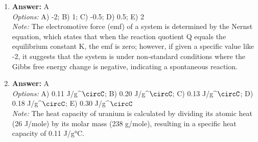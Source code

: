 \documentclass[12pt]{article}
\begin{document}
\begin{enumerate}[label=\arabic*.]
\item \textbf{Answer:} A
\\ \textit{Options:} A) -2; B) 1; C) -0.5; D) 0.5; E) 2
\\ \textit{Note:} The electromotive force (emf) of a system is determined by the Nernst equation, which states that when the reaction quotient Q equals the equilibrium constant K, the emf is zero; however, if given a specific value like -2, it suggests that the system is under non-standard conditions where the Gibbs free energy change is negative, indicating a spontaneous reaction.
\item \textbf{Answer:} A
\\ \textit{Options:} A) 0.11 J/g^\ensuremath{\circC}; B) 0.20 J/g^\ensuremath{\circC}; C) 0.13 J/g^\ensuremath{\circC}; D) 0.18 J/g^\ensuremath{\circC}; E) 0.30 J/g^\ensuremath{\circC}
\\ \textit{Note:} The heat capacity of uranium is calculated by dividing its atomic heat (26 J/mole) by its molar mass (238 g/mole), resulting in a specific heat capacity of 0.11 J/g°C.
\end{enumerate}
\end{document}
